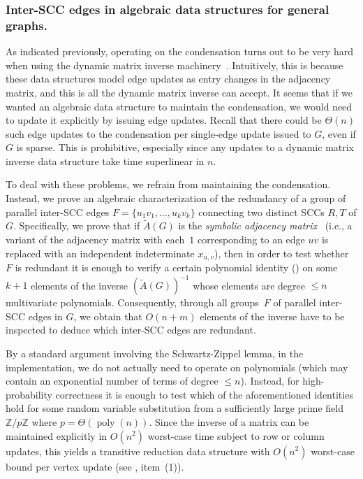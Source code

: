 \documentclass[11pt]{article}
\newcommand{\poly}[1]{\ensuremath{\operatorname{poly}\left( #1 \right)}\xspace}
\begin{document}
\subsubsection{Inter-SCC edges in algebraic data structures for general graphs.} 
As indicated previously, operating on the condensation turns out to be very hard when using the dynamic matrix inverse machinery~\cite{BrandNS19, Sankowski04}.
Intuitively, this is because these data structures model edge updates as entry changes in the adjacency matrix, and this is all the dynamic matrix inverse can accept.
It seems that if we wanted an algebraic data structure to maintain the condensation, we would need to update it explicitly by issuing edge updates. Recall that there could be $\Theta(n)$ such edge updates to the condensation per single-edge update issued to $G$, even if $G$ is sparse.
This is prohibitive, especially since any updates to a dynamic matrix inverse data structure take time superlinear in $n$.

To deal with these problems, we refrain from maintaining the condensation.
Instead, we prove an algebraic characterization of the redundancy of a group of parallel inter-SCC edges \linebreak ${F=\{u_1v_1,\ldots,u_kv_k\}}$ connecting two distinct SCCs $R,T$ of $G$.
Specifically, we prove that if $\tilde{A}(G)$ is the \emph{symbolic adjacency matrix}~\cite{Sankowski04} (i.e., a variant of the adjacency matrix with each~$1$ corresponding to an edge $uv$ is replaced with an independent indeterminate $x_{u,v}$), then in order to test whether~$F$ is redundant it is enough to verify a certain polynomial identity () on some $k+1$ elements of the inverse $(\tilde{A}(G))^{-1}$ whose elements are degree $\leq n$ multivariate polynomials.
Consequently, through all groups~$F$ of parallel inter-SCC edges in $G$, we obtain
that $O(n+m)$ elements of the inverse have to be inspected to deduce which inter-SCC edges are redundant.

By a standard argument involving the Schwartz-Zippel lemma, in the implementation, we do not actually need to operate on polynomials (which may contain an exponential number of terms of degree $\leq n$).
Instead, for high-probability correctness it is enough to test which of the aforementioned identities hold for some random variable substitution from a sufficiently large prime field $\mathbb{Z}/p\mathbb{Z}$ where $p=\Theta(\poly{n})$.
Since the inverse of a matrix can be maintained explicitly in $O(n^2)$ worst-case time subject to row or column updates, this yields a transitive reduction data structure with $O(n^2)$ worst-case bound per vertex update (see , item~(1)).
\end{document}
